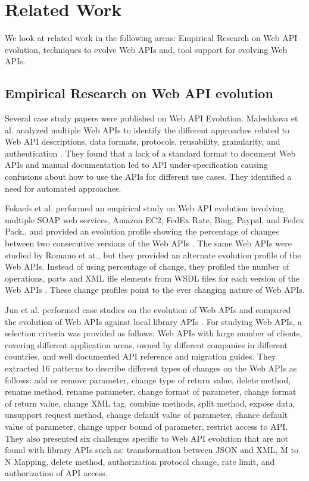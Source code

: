 \section{Related Work}

We look at related work in the following areas: Empirical Research on Web API evolution, techniques to evolve Web APIs and, tool support for evolving Web APIs.

\subsection{Empirical Research on Web API evolution} %
\label{sub:empirical_research}
Several case study papers were published on Web API Evolution. Maleshkova et al. analyzed multiple Web APIs to identify the different approaches related to Web API descriptions, data formats, protocols, reusability, granularity, and authentication \cite{maleshkova}. They found that a lack of a standard format to document Web APIs and manual documentation led to API under-specification causing confusions about how to use the APIs for different use cases. They identified a need for automated approaches.

Fokaefs et al. performed an empirical study on Web API evolution involving multiple SOAP web services, Amazon EC2, FedEx Rate, Bing, Paypal, and Fedex Pack., and provided an evolution profile showing the percentage of changes between two consecutive versions of the Web APIs \cite{fokaefs_2011_empirical}. The same Web APIs were studied by Romano et at., but they provided an alternate evolution profile of the Web APIs. Instead of using percentage of change, they profiled the number of operations, parts and XML file elements from WSDL files for each version of the Web APIs \cite{wsdl_diff_2012}. These change profiles point to the ever changing nature of Web APIs.

Jun et al. performed case studies on the evolution of Web APIs and compared the evolution of Web APIs against local library APIs \cite{li_client_2013}. For studying Web APIs, a selection criteria was provided as follows: Web APIs with large number of clients, covering different application areas, owned by different companies in different countries, and well documented API reference and migration guides. They extracted 16 patterns to describe different types of changes on the Web APIs as follows: add or remove parameter, change type of return value, delete method, rename method, rename parameter, change format of parameter, change format of return value, change XML tag, combine methods, split method, expose data, unsupport request method, change default value of parameter, chance default value of parameter, change upper bound of parameter, restrict access to API. They also presented six challenges specific to Web API evolution that are not found with library APIs such as: transformation between JSON and XML, M to N Mapping, delete method, authorization protocol change, rate limit, and authorization of API access.

